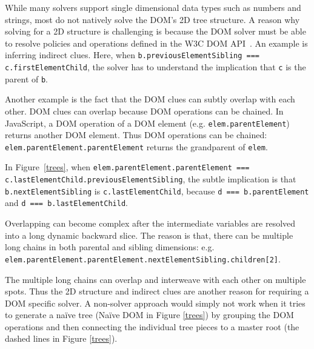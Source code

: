 While many solvers support single dimensional data types such as numbers and strings, most do not natively solve the DOM's 2D tree structure.    
A reason why solving for a 2D structure is challenging is because the DOM solver must be able to resolve policies and operations defined in the W3C DOM API~\cite{w3dom}.  
An example is inferring indirect clues.  Here, when {\tt b.previousElementSibling === c.firstElementChild}, the solver has to understand the implication that {\tt c} is the parent of {\tt b}.  

Another example is the fact that the DOM clues can subtly overlap with each other.  DOM clues can overlap because DOM operations can be chained.  
In JavaScript, a DOM operation of a DOM element (e.g. {\tt elem.parentElement}) returns another DOM element.  Thus DOM operations can be chained: {\tt elem.parentElement.parentElement} returns the grandparent of {\tt elem}.

In Figure~\ref{trees}, when {\tt elem.parentElement.parentElement === c.lastElementChild.previousElementSibling}, 
the subtle implication is that {\tt b.nextElementSibling} is {\tt c.lastElementChild}, because {\tt d === b.parentElement} and {\tt d === b.lastElementChild}.  

Overlapping can become complex after the intermediate variables are resolved into a long dynamic backward slice.  
The reason is that, there can be multiple long chains in both parental and sibling dimensions: e.g. {\tt elem.parentElement.parentElement.nextElementSibling.children[2]}.  

The multiple long chains can overlap and interweave with each other on multiple spots.  Thus the 2D structure and indirect clues are another reason for requiring a DOM specific solver.  
A non-solver approach would simply not work when it tries to generate a na\"{i}ve tree (Na\"{i}ve DOM in Figure \ref{trees}) by grouping the DOM operations and then connecting the individual tree pieces to a master root (the dashed lines in Figure \ref{trees}).  


